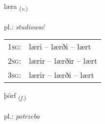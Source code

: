 \documentclass[frontgrid, backgrid]{flacards}\usepackage[]{graphicx}\usepackage[]{xcolor}
\begin{document}
\renewcommand{\flhead}{\vskip5pt \fboxsep=0pt {\small\bfseries\footnotesize Sagnorð | Verb}}
\renewcommand{\fcfoot}{\vskip5pt \fboxsep=0pt \hspace{2pt}{\small\bfseries\footnotesize 1K}}

\renewcommand{\blhead}{\vskip5pt {\small\bfseries\footnotesize Sagnorð | Verb }}
\renewcommand{\bcfoot}{\vskip5pt \hspace{2pt}{\small\bfseries\footnotesize 1K}}


{læra \small{\textsubscript{(\textit{v.})}} \\[1ex] %
\textphonetic{[laiːra]} \\
pl.: \emph{studiować} \\  [2ex]
\renewcommand*{\arraystretch}{0.8}
\begin{tabular}{p{1cm}l}
\textsc{1sg}: & læri -- lærði -- lært \\ 
\textsc{2sg}: & lærir -- lærðir -- lært \\ 
\textsc{3sg}: & lærir -- lærði -- lært \\ 
\end{tabular}
}

\renewcommand{\flhead}{\vskip5pt \fboxsep=0pt {\small\bfseries\footnotesize Nafnorð | Noun}}
\renewcommand{\fcfoot}{\vskip5pt \fboxsep=0pt \hspace{2pt}{\small\bfseries\footnotesize 1K}}

\renewcommand{\blhead}{\vskip5pt {\small\bfseries\footnotesize Nafnorð | Noun }}
\renewcommand{\bcfoot}{\vskip5pt \hspace{2pt}{\small\bfseries\footnotesize 1K}}


{þörf \small{\textsubscript{(\textit{f.})}} \\[1ex] %
\textphonetic{[θœrv]} \\
pl.: \emph{potrzeba} \\  [2ex]
\renewcommand*{\arraystretch}{0.8}
}
\end{document}
